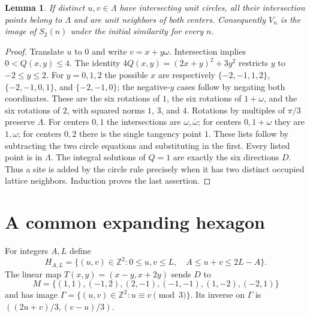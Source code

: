 \documentclass[11pt]{article}
\newtheorem{lemma}[theorem]{Lemma}
\newcommand{\Z}{\mathbb Z}
\begin{document}
\begin{lemma}\label{lem:circle}
If distinct $u,v\in\Lambda$ have intersecting unit circles, all their
intersection points belong to $\Lambda$ and are unit neighbors of both
centers. Consequently $V_n$ is the image of $S_2(n)$ under the initial
similarity for every $n$.
\end{lemma}
\begin{proof}
Translate $u$ to $0$ and write $v=x+y\omega$. Intersection implies
$0<Q(x,y)\leq4$. The identity
$4Q(x,y)=(2x+y)^2+3y^2$ restricts $y$ to $-2\leq y\leq2$.
For $y=0,1,2$ the possible $x$ are respectively
$\{-2,-1,1,2\}$, $\{-2,-1,0,1\}$, and $\{-2,-1,0\}$;
the negative-$y$ cases follow by negating both coordinates. These are
the six rotations of $1$, the six rotations of $1+\omega$, and the
six rotations of $2$, with squared norms $1$, $3$, and $4$.
Rotations by multiples of $\pi/3$ preserve $\Lambda$.
For centers $0,1$ the intersections are $\omega,\overline\omega$;
for centers $0,1+\omega$ they are $1,\omega$; for centers $0,2$
there is the single tangency point $1$. These lists follow by subtracting
the two circle equations and substituting in the first. Every listed point
is in $\Lambda$. The integral solutions of $Q=1$ are exactly the six
directions $D$. Thus a site is added by the circle rule precisely when it
has two distinct occupied lattice neighbors. Induction proves the last assertion.
\end{proof}

\section{A common expanding hexagon}
For integers $A,L$ define
\[
 H_{A,L}=\{(u,v)\in\Z^2:0\leq u,v\leq L,\quad
                         A\leq u+v\leq2L-A\}.
\]
The linear map $T(x,y)=(x-y,x+2y)$ sends $D$ to
\[
 M=\{(1,1),(-1,2),(2,-1),(-1,-1),(1,-2),(-2,1)\}
\]
and has image $\Gamma=\{(u,v)\in\Z^2:u\equiv v\pmod3\}$.
Its inverse on $\Gamma$ is $((2u+v)/3,(v-u)/3)$.
\end{document}
